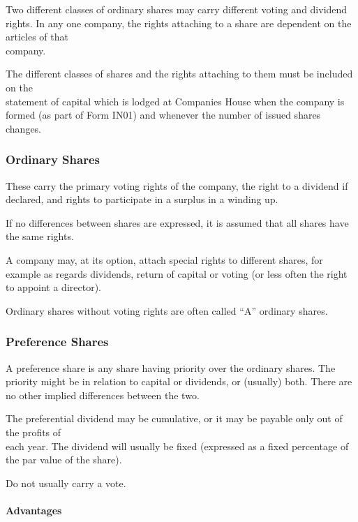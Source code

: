 \documentclass[
]{article}
\begin{document}
Two different classes of ordinary shares may carry different voting and
dividend rights. In any one company, the rights attaching to a share are
dependent on the articles of that\\
company.

The different classes of shares and the rights attaching to them must be
included on the\\
statement of capital which is lodged at Companies House when the company
is formed (as part of Form IN01) and whenever the number of issued
shares changes.

\hypertarget{ordinary-shares-1}{%
\subsubsection{Ordinary Shares}\label{ordinary-shares-1}}

These carry the primary voting rights of the company, the right to a
dividend if declared, and rights to participate in a surplus in a
winding up.

If no differences between shares are expressed, it is assumed that all
shares have the same rights.

A company may, at its option, attach special rights to different shares,
for example as regards dividends, return of capital or voting (or less
often the right to appoint a director).

Ordinary shares without voting rights are often called ``A'' ordinary
shares.

\hypertarget{preference-shares-1}{%
\subsubsection{Preference Shares}\label{preference-shares-1}}

A preference share is any share having priority over the ordinary
shares. The priority might be in relation to capital or dividends, or
(usually) both. There are no other implied differences between the two.

The preferential dividend may be cumulative, or it may be payable only
out of the profits of\\
each year. The dividend will usually be fixed (expressed as a fixed
percentage of the par value of the share).

Do not usually carry a vote.

\hypertarget{advantages}{%
\paragraph{Advantages}\label{advantages}}
\end{document}
